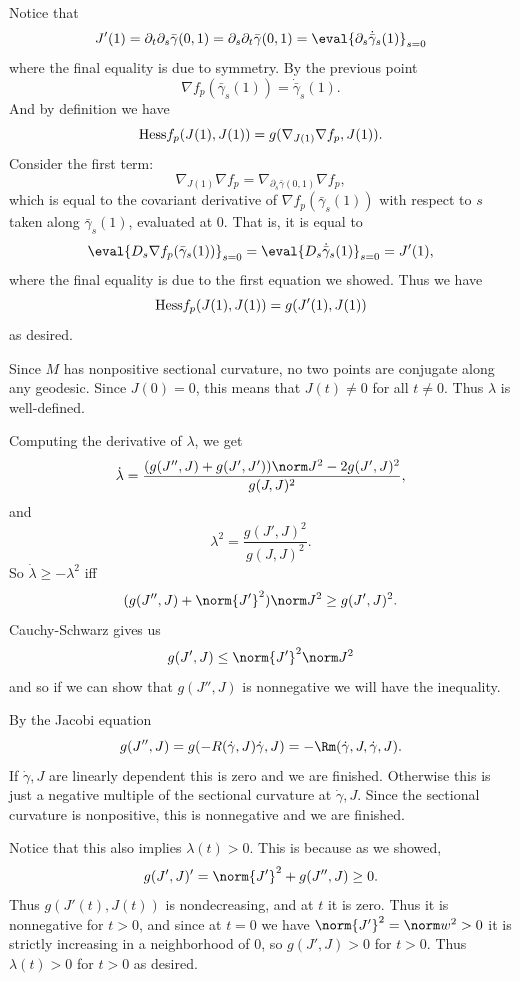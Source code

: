     \item Notice that
    $$ J'(1) = \partial_t\partial_s\bar\gamma(0,1) = \partial_s\partial_t\bar\gamma(0,1) =
    \eval{\partial_s\dot{\bar\gamma}_s(1)}_{s=0} $$
    where the final equality is due to symmetry.
    By the previous point
    $$ \nabla f_p(\bar\gamma_s(1)) = \dot{\bar\gamma}_s(1) . $$
    And by definition we have
    $$ {\rm Hess} f_p(J(1),J(1)) = g(\nabla_{J(1)}\nabla f_p,J(1)) . $$
    Consider the first term:
    $$ \nabla_{J(1)}\nabla f_p = \nabla_{\partial_s\bar\gamma(0,1)}\nabla f_p , $$
    which is equal to the covariant derivative of $\nabla f_p(\bar\gamma_s(1))$ with respect to $s$ taken along
    $\bar\gamma_s(1)$, evaluated at $0$.
    That is, it is equal to
    $$ \eval{D_s\nabla f_p(\bar\gamma_s(1))}_{s=0} = \eval{D_s\dot{\bar\gamma}_s(1)}_{s=0} = J'(1) , $$
    where the final equality is due to the first equation we showed.
    Thus we have
    $$ {\rm Hess} f_p(J(1),J(1)) = g(J'(1),J(1)) $$
    as desired.

    \item Since $M$ has nonpositive sectional curvature, no two points are conjugate along any geodesic.
    Since $J(0)=0$, this means that $J(t)\neq0$ for all $t\neq0$.
    Thus $\lambda$ is well-defined.

    Computing the derivative of $\lambda$, we get
    $$ \dot\lambda = \frac{(g(J'',J) + g(J',J'))\norm J^2 - 2g(J',J)^2}{g(J,J)^2} , $$
    and
    $$ \lambda^2 = \frac{g(J',J)^2}{g(J,J)^2} . $$
    So $\dot\lambda\geq-\lambda^2$ iff
    $$ (g(J'',J) + \norm{J'}^2)\norm J^2 \geq g(J',J)^2 . $$
    Cauchy-Schwarz gives us
    $$ g(J',J) \leq \norm{J'}^2\norm J^2 $$
    and so if we can show that $g(J'',J)$ is nonnegative we will have the inequality.

    By the Jacobi equation
    $$ g(J'',J) = g(-R(\dot\gamma,J)\dot\gamma,J) = -\Rm(\dot\gamma,J,\dot\gamma,J) . $$
    If $\dot\gamma,J$ are linearly dependent this is zero and we are finished.
    Otherwise this is just a negative multiple of the sectional curvature at $\dot\gamma,J$.
    Since the sectional curvature is nonpositive, this is nonnegative and we are finished.

    Notice that this also implies $\lambda(t)>0$.
    This is because as we showed,
    $$ g(J',J)' = \norm{J'}^2 + g(J'',J) \geq 0 . $$
    Thus $g(J'(t),J(t))$ is nondecreasing, and at $t$ it is zero.
    Thus it is nonnegative for $t>0$, and since at $t=0$ we have $\norm{J'}^2=\norm w^2>0$ it is strictly increasing
    in a neighborhood of $0$, so $g(J',J)>0$ for $t>0$.
    Thus $\lambda(t)>0$ for $t>0$ as desired.

